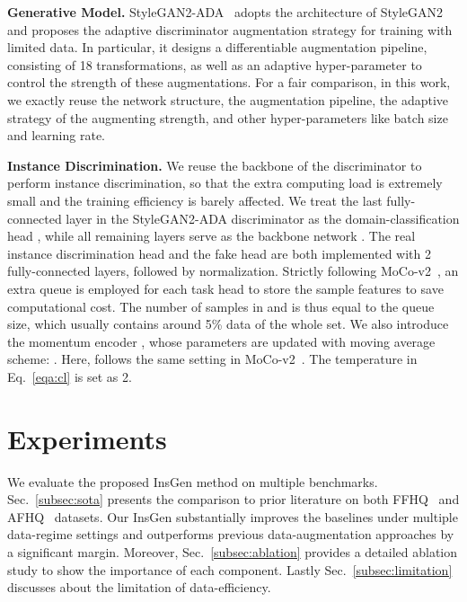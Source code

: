 \documentclass{article}
\begin{document}
\textbf{Generative Model.}
StyleGAN2-ADA~\cite{karras2020training} adopts the architecture of StyleGAN2~\cite{Karras2019stylegan2} and proposes the adaptive discriminator augmentation strategy for training with limited data.
In particular, it designs a differentiable augmentation pipeline, consisting of 18 transformations, as well as an adaptive hyper-parameter to control the strength of these augmentations.
For a fair comparison, in this work, we exactly reuse the network structure, the augmentation pipeline, the adaptive strategy of the augmenting strength, and other hyper-parameters like batch size and learning rate.


\textbf{Instance Discrimination.}
We reuse the backbone of the discriminator to perform instance discrimination, so that the extra computing load is extremely small and the training efficiency is barely affected.
We treat the last fully-connected layer in the StyleGAN2-ADA discriminator as the domain-classification head , while all remaining layers serve as the backbone network .
The real instance discrimination head  and the fake head  are both implemented with 2 fully-connected layers, followed by  normalization.
Strictly following MoCo-v2~\cite{chen2020mocov2}, an extra queue is employed for each task head to store the sample features to save computational cost.
The number of samples in  and  is thus equal to the queue size, which usually contains around 5\% data of the whole set.
We also introduce the momentum encoder , whose parameters are updated with moving average scheme: .
Here,  follows the same setting in MoCo-v2~\cite{chen2020mocov2}.
The temperature  in Eq.~\eqref{eqa:cl} is set as 2.


\section{Experiments}\label{sec:exp}


We evaluate the proposed InsGen method on multiple benchmarks.  Sec.~\ref{subsec:sota} presents the comparison to prior literature on both FFHQ~\cite{karras2019style} and AFHQ~\cite{choi2020starganv2} datasets. Our InsGen substantially improves the baselines under multiple data-regime settings and outperforms previous data-augmentation approaches by a significant margin. Moreover, Sec.~\ref{subsec:ablation} provides a detailed ablation study to show the importance of each component. Lastly Sec.~\ref{subsec:limitation} discusses about the limitation of data-efficiency.
\end{document}
